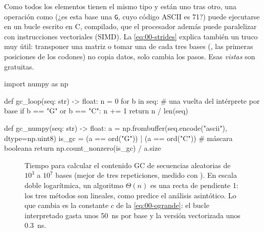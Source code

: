 \begin{simbolos}
\end{simbolos}

Como todos los elementos tienen el mismo tipo y están uno tras otro, una operación como  (¿es esta base una \texttt{G}, cuyo código ASCII es 71?) puede ejecutarse en un bucle escrito en C, compilado, que el procesador además puede paralelizar con instrucciones vectoriales (SIMD). La \cref{eq:00-strides} explica también un truco muy útil: transponer una matriz o tomar una de cada tres bases (, las primeras posiciones de los codones) no copia datos, solo cambia los pasos. Esas \emph{vistas} son gratuitas.

\begin{codigo}[gc\_vectorizado.py]
import numpy as np

def gc_loop(seq: str) -> float:
    n = 0
    for b in seq:                      # una vuelta del intérprete por base
        if b == "G" or b == "C":
            n += 1
    return n / len(seq)

def gc_numpy(seq: str) -> float:
    a = np.frombuffer(seq.encode("ascii"), dtype=np.uint8)
    is_gc = (a == ord("G")) | (a == ord("C"))   # máscara booleana
    return np.count_nonzero(is_gc) / a.size
\end{codigo}

\begin{figure}[t]
\centering
{}
\caption[Bucle frente a vectorización]{Tiempo para calcular el contenido GC de secuencias aleatorias de $10^3$ a $10^7$ bases (mejor de tres repeticiones, medido con ). En escala doble logarítmica, un algoritmo $\Theta(n)$ es una recta de pendiente 1: los tres métodos son lineales, como predice el análisis asintótico. Lo que cambia es la constante $c$ de la \cref{eq:00-ogrande}: el bucle interpretado gasta unos \SI{50}{ns} por base y la versión vectorizada unos \SI{0,3}{ns}.}
\label{fig:00-tiempos}
\end{figure}

